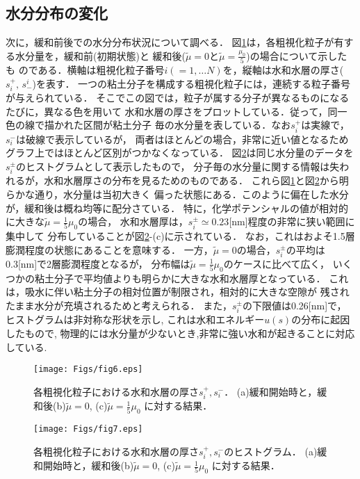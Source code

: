 \subsection{水分分布の変化}
次に，緩和前後での水分分布状況について調べる．
図\ref{fig:fig6}は，各粗視化粒子が有する水分量を，緩和前(初期状態)と
緩和後($\tilde \mu=0$と$\tilde \mu =\frac{\mu_0}{5}$)の場合について示したも
のである．横軸は粗視化粒子番号$i(=1,\dots N)$を，縦軸は水和水層の厚さ($s_i^+,\, s^i_-$)を表す．
一つの粘土分子を構成する粗視化粒子には，連続する粒子番号が与えられている．
そこでこの図では，粒子が属する分子が異なるものになるたびに，異なる色を用いて
水和水層の厚さをプロットしている．従って，同一色の線で描かれた区間が粘土分子
毎の水分量を表している．なお$s^+_i$は実線で，$s^-_i$は破線で表示しているが，
両者はほとんどの場合，非常に近い値となるためグラフ上ではほとんど区別がつかなくなっている．
図\ref{fig:fig7}は同じ水分量のデータを$s^\pm_i$のヒストグラムとして表示したもので，
分子毎の水分量に関する情報は失われるが，水和水層厚さの分布を見るためのものである．
これら図\ref{fig:fig6}と図\ref{fig:fig7}から明らかな通り，水分量は当初大きく
偏った状態にある．このように偏在した水分が，緩和後は概ね均等に配分さている．
特に，化学ポテンシャルの値が相対的に大きな$\tilde \mu= \frac{1}{5}\mu_0$の場合，
水和水層厚は，$s^{\pm}_i\simeq 0.23$[nm]程度の非常に狭い範囲に集中して
分布していることが図\ref{fig:fig7}-(c)に示されている．
なお，これはおよそ1.5層膨潤程度の状態にあることを意味する．
一方，$\tilde \mu=0$の場合，$s^\pm_i$の平均は0.3[nm]で2層膨潤程度となるが，
分布幅は$\tilde \mu =\frac{1}{5}\mu_0$のケースに比べて広く，
いくつかの粘土分子で平均値よりも明らかに大きな水和水層厚となっている．
これは，吸水に伴い粘土分子の相対位置が制限され，相対的に大きな空隙が
残されたまま水分が充填されるためと考えられる．
また，$s^\pm_i$の下限値は0.26[nm]で，ヒストグラムは非対称な形状を示し,
これは水和エネルギー$u(s)$の分布に起因したもので,
物理的には水分量が少ないとき,非常に強い水和が起きることに対応している.
\begin{figure}[h]
	\begin{center}
	\texttt{[image: Figs/fig6.eps]} 
	\end{center}
	\caption{
		各粗視化粒子における水和水層の厚さ$s_i^+,s_i^-$．
		(a)緩和開始時と，緩和後(b)$\tilde \mu=0$, (c)$\tilde \mu =\frac{1}{5}\mu_0$
		に対する結果．
	} 
	\label{fig:fig6}
\end{figure}
\begin{figure}[h]
	\begin{center}
	\texttt{[image: Figs/fig7.eps]} 
	\end{center}
	\caption{
		各粗視化粒子における水和水層の厚さ$s_i^+,s_i^-$のヒストグラム．
		(a)緩和開始時と，緩和後(b)$\tilde \mu=0$, (c)$\tilde \mu =\frac{1}{5}\mu_0$
		に対する結果．
	} 
	\label{fig:fig7}
\end{figure}
